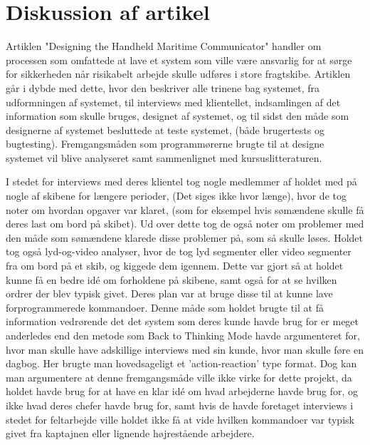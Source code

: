\documentclass[10pt,a4paper,danish]{article}
\begin{document}
\section{Diskussion af artikel}
Artiklen "Designing the Handheld Maritime Communicator" handler om processen som omfattede at
lave et system som ville være ansvarlig for at sørge for sikkerheden når risikabelt arbejde skulle udføres 
i store fragtskibe. Artiklen går i dybde med dette, hvor den beskriver alle trinene bag systemet, fra 
udformningen af systemet, til interviews med klientellet, indsamlingen af det information som skulle 
bruges, designet af systemet, og til sidst den måde som designerne af systemet besluttede at teste systemet, 
(både brugertests og bugtesting). Fremgangsmåden som programmørerne brugte til at designe systemet vil blive 
analyseret samt sammenlignet med kursuslitteraturen.

I stedet for interviews med deres klientel tog nogle medlemmer af holdet med på nogle af skibene for længere perioder, 
(Det siges ikke hvor længe), hvor de tog noter om hvordan opgaver var klaret, (som for eksempel hvis sømændene skulle 
få deres last om bord på skibet). Ud over dette tog de også noter om problemer med den måde som sømændene klarede 
disse problemer på, som så skulle løses. Holdet tog også lyd-og-video analyser, hvor de tog lyd segmenter eller 
video segmenter fra om bord på et skib, og kiggede dem igennem. Dette var gjort så at holdet kunne få en bedre 
idé om forholdene på skibene, samt også for at se hvilken ordrer der blev typisk givet. Deres plan var at bruge disse 
til at kunne lave forprogrammerede kommandoer. Denne måde som holdet brugte til at få information vedrørende det 
det system som deres kunde havde brug for er meget anderledes end den metode som Back to Thinking Mode havde 
argumenteret for, hvor man skulle have adskillige interviews med sin kunde, hvor man skulle føre en dagbog. Her brugte 
man hovedsageligt et 'action-reaction' type format. Dog kan man argumentere at denne fremgangsmåde 
ville ikke virke for dette projekt, da holdet havde brug for at have en klar idé om hvad arbejderne havde brug for, og 
ikke hvad deres chefer havde brug for, samt hvis de havde foretaget interviews i stedet for feltarbejde ville holdet ikke 
få at vide hvilken kommandoer var typisk givet fra kaptajnen eller lignende højrestående arbejdere.
\end{document}
